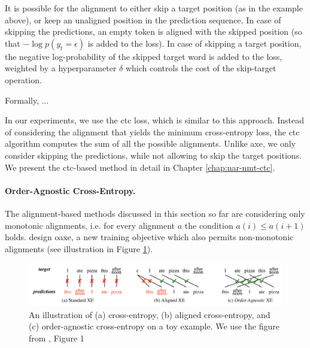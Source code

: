 It is possible for the alignment to either skip a target position (as in the
example above), or keep an unaligned position in the prediction sequence. In
case of skipping the predictions, an empty token is aligned with the skipped
position (so that $-\log p(y_t = \epsilon)$ is added to the loss). In case of
skipping a target position, the negative log-probability of the skipped target
word is added to the loss, weighted by a hyperparameter $\delta$ which controls
the cost of the skip-target operation.

Formally, ... 

In our experiments, we use the \ac{ctc} loss, which is similar to this
approach. Instead of considering the alignment that yields the minimum
cross-entropy loss, the \ac{ctc} algorithm computes the sum of all the possible
alignments. Unlike \ac{axe}, we only consider skipping the predictions, while
not allowing to skip the target positions. We present the \ac{ctc}-based method
in detail in Chapter \ref{chap:nar-nmt-ctc}.


\paragraph{Order-Agnostic Cross-Entropy.} The alignment-based methods discussed
in this section so far are considering only monotonic alignments, i.e. for
every alignment $a$ the condition $a(i) \leq a(i + 1)$
holds. \citet{du2021orderagnostic} design \ac{oaxe}, a new training objective
which also permits non-monotonic alignments (see illustration in Figure
\ref{fig:oaxe-example}).  

\begin{figure}
  \centering
  \includegraphics[width=\textwidth]{img/oaxe.png}

  \caption{An illustration of (a) cross-entropy, (b) aligned cross-entropy, and
    (c) order-agnostic cross-entropy on a toy example. We use the figure from
    \citet{du2021orderagnostic}, Figure 1}%
  \label{fig:oaxe-example}
\end{figure}

